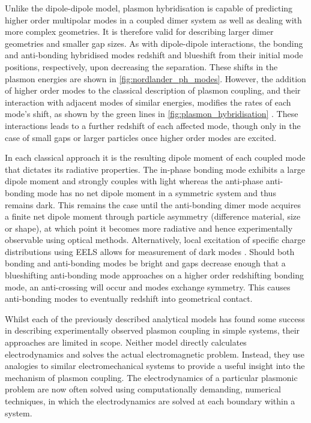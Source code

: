 \documentclass{article}
\begin{document}
Unlike the dipole-dipole model, plasmon hybridisation is capable of predicting higher order multipolar modes in a coupled dimer system as well as dealing with more complex geometries. It is therefore valid for describing larger dimer geometries and smaller gap sizes. As with dipole-dipole interactions, the bonding and anti-bonding hybridised modes redshift and blueshift from their initial mode positions, respectively, upon decreasing the separation. These shifts in the plasmon energies are shown in \autoref{fig:nordlander_ph_modes}. However, the addition of higher order modes to the classical description of plasmon coupling, and their interaction with adjacent modes of similar energies, modifies the rates of each mode's shift, as shown by the green lines in \autoref{fig:plasmon_hybridisation} \cite{nordlander2004}. These interactions leads to a further redshift of each affected mode, though only in the case of small gaps or larger particles once higher order modes are excited.

In each classical approach it is the resulting dipole moment of each coupled mode that dictates its radiative properties. The in-phase bonding mode exhibits a large dipole moment and strongly couples with light whereas the anti-phase anti-bonding mode has no net dipole moment in a symmetric system and thus remains dark. This remains the case until the anti-bonding dimer mode acquires a finite net dipole moment through particle asymmetry (difference material, size or shape), at which point it becomes more radiative and hence experimentally observable using optical methods. Alternatively, local excitation of specific charge distributions using EELS allows for measurement of dark modes \cite{chu2008, koh2009}. Should both bonding and anti-bonding modes be bright and gaps decrease enough that a blueshifting anti-bonding mode approaches on a higher order redshifting bonding mode, an anti-crossing will occur and modes exchange symmetry. This causes anti-bonding modes to eventually redshift into geometrical contact.

Whilst each of the previously described analytical models has found some success in describing experimentally observed plasmon coupling in simple systems, their approaches are limited in scope. Neither model directly calculates electrodynamics and solves the actual electromagnetic problem. Instead, they use analogies to similar electromechanical systems to provide a useful insight into the mechanism of plasmon coupling. The electrodynamics of a particular plasmonic problem are now often solved using computationally demanding, numerical techniques, in which the electrodynamics are solved at each boundary within a system.
\end{document}
